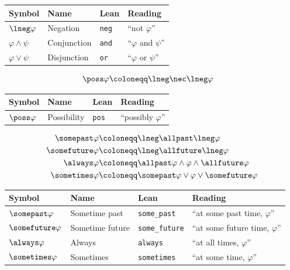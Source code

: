 \documentclass[../BimodalReference.tex]{subfiles}
\begin{document}
\begin{center}
\begin{tabular}{@{}lllp{4cm}@{}}
\toprule
Symbol & Name & Lean & Reading \\
\midrule
$\lneg\varphi$ & Negation & \texttt{neg} & ``not $\varphi$'' \\
$\varphi \land \psi$ & Conjunction & \texttt{and} & ``$\varphi$ and $\psi$'' \\
$\varphi \lor \psi$ & Disjunction & \texttt{or} & ``$\varphi$ or $\psi$'' \\
\bottomrule
\end{tabular}
\end{center}

\begin{definition}[Modal]
\begin{align*}
  \poss\varphi &\coloneqq \lneg\nec\lneg\varphi
\end{align*}
\end{definition}

\begin{center}
\begin{tabular}{@{}lllp{4cm}@{}}
\toprule
Symbol & Name & Lean & Reading \\
\midrule
$\poss\varphi$ & Possibility & \texttt{pos} & ``possibly $\varphi$'' \\
\bottomrule
\end{tabular}
\end{center}

\begin{definition}[Temporal]
\begin{align*}
  \somepast\varphi &\coloneqq \lneg\allpast\lneg\varphi \\
  \somefuture\varphi &\coloneqq \lneg\allfuture\lneg\varphi \\
  \always\varphi &\coloneqq \allpast\varphi \land \varphi \land \allfuture\varphi \\
  \sometimes\varphi &\coloneqq \somepast\varphi \lor \varphi \lor \somefuture\varphi
\end{align*}
\end{definition}

\begin{center}
\begin{tabular}{@{}lllp{4.5cm}@{}}
\toprule
Symbol & Name & Lean & Reading \\
\midrule
$\somepast\varphi$ & Sometime past & \texttt{some\_past} & ``at some past time, $\varphi$'' \\
$\somefuture\varphi$ & Sometime future & \texttt{some\_future} & ``at some future time, $\varphi$'' \\
$\always\varphi$ & Always & \texttt{always} & ``at all times, $\varphi$'' \\
$\sometimes\varphi$ & Sometimes & \texttt{sometimes} & ``at some time, $\varphi$'' \\
\bottomrule
\end{tabular}
\end{center}
\end{document}
